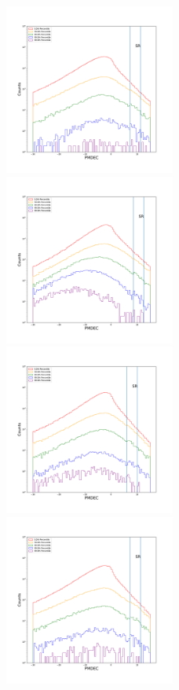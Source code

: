 \documentclass[12pt,prd]{article}
\begin{document}
\begin{figure}[h!]
\centering
\includegraphics[width=0.5\textwidth]{../figures/scanning_plotsgaiascan_l22_5_b74_4_ra209_6_dec23_3_npy.pdf}
\includegraphics[width=0.5\textwidth]{../figures/scanning_plotsgaiascan_l101_2_b58_4_ra212_7_dec55_2_npy.pdf}
\includegraphics[width=0.5\textwidth]{../figures/scanning_plotsgaiascan_l315_0_b66_4_ra197_7_dec4_0_npy.pdf}
\includegraphics[width=0.5\textwidth]{../figures/scanning_plotsgaiascan_l337_5_b74_4_ra201_9_dec14_0_npy.pdf}

\end{figure}
\end{document}
